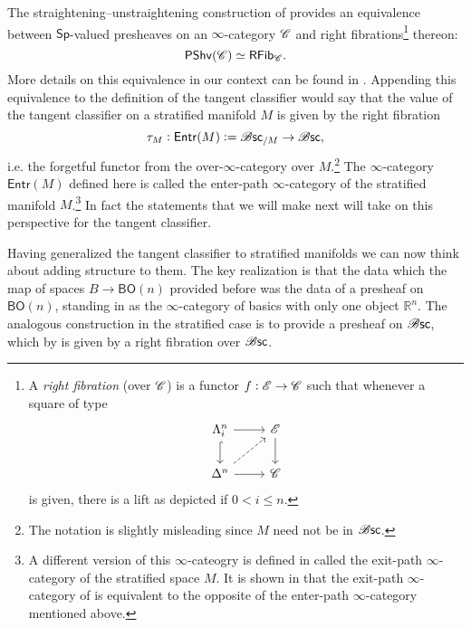 \documentclass[../text]{subfiles}
\begin{document}
\begin{remark}\label{rem:grothendieck_construction}
    The straightening--unstraightening construction of \cite[§2.2]{lurie_htt} provides an equivalence between $\mathsf{Sp}$-valued presheaves on an $\infty$-category $\mathscr{C}$ and right fibrations\footnote{A \emph{right fibration} (over $\mathscr{C}$) is a functor $f:\mathscr{E} \rightarrow \mathscr{C}$ such that whenever a square of type
    \begin{equation}
        \begin{tikzcd}[ampersand replacement=\&]
            \Lambda^n_i \arrow[r] \arrow[d, hook] \& \mathscr{E} \arrow[d] \\
            \Delta^n \arrow[r] \arrow[ru, dashed] \& \catC        
        \end{tikzcd}
    \end{equation}
    is given, there is a lift as depicted if $0 < i \leq n$.} thereon:
    \begin{equation}
        \mathsf{PShv}(\mathscr{C}) \simeq \mathsf{RFib}_{\mathscr{C}}.
    \end{equation}
    More details on this equivalence in our context can be found in \cite[§4.2]{aft_localstrut}. Appending this equivalence to the definition of the tangent classifier would say that the value of the tangent classifier on a stratified manifold $M$ is given by the right fibration
    \begin{equation}
        \tau_M: \mathsf{Entr}(M) := \mathscr{B} \mathsf{sc}_{/M} \rightarrow \mathscr{B} \mathsf{sc},
    \end{equation}
    i.e. the forgetful functor from the over-$\infty$-category over $M$.\footnote{The notation is slightly misleading since $M$ need not be in $\mathscr{B} \mathsf{sc}$.} The $\infty$-category $\mathsf{Entr}(M)$ defined here is called the enter-path $\infty$-category of the stratified manifold $M$.\footnote{A different version of this $\infty$-cateogry is defined in \cite[§A.6]{lurie_ha} called the exit-path $\infty$-category of the stratified space $M$. It is shown in \cite{afr_homhyp} that the exit-path $\infty$-category of \cite[§A.6]{lurie_ha} is equivalent to the opposite of the enter-path $\infty$-category mentioned above.} In fact the statements that we will make next will take on this perspective for the tangent classifier.
\end{remark}

Having generalized the tangent classifier to stratified manifolds we can now think about adding structure to them. The key realization is that the data which the map of spaces $B \rightarrow \mathsf{BO}(n)$ provided before was the data of a presheaf on $\mathsf{BO}(n)$, standing in as the $\infty$-category of basics with only one object $\mathbb{R}^n$. The analogous construction in the stratified case is to provide a presheaf on $\mathscr{B} \mathsf{sc}$, which by  is given by a right fibration over $\mathscr{B} \mathsf{sc}$. 
\end{document}
